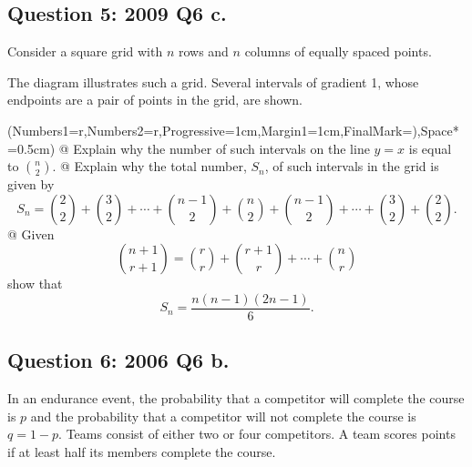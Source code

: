 \documentclass[a4paper,11pt]{article}
\begin{document}

\subsection*{Question 5: 2009 Q6 c.}
Consider a square grid with $n$ rows and $n$ columns of equally spaced points.

\begin{center}
\end{center}
The diagram illustrates such a grid. Several intervals of gradient 1, whose endpoints are a pair of points in the grid, are shown. 
\pagebreak
\vspace{0.15cm}
	\begin{easylist}[enumerate]
		\ListProperties(Numbers1=r,Numbers2=r,Progressive=1cm,Margin1=1cm,FinalMark={)},Space*=0.5cm)
		@ Explain why the number of such intervals on the line $y=x$ is equal to $\binom{n}{2}$.
        @ Explain why the total number, $S_n$, of such intervals in the grid is given by 
        $$
        S_n = \binom{2}{2} + \binom{3}{2} + \cdots + \binom{n-1}{2} + \binom{n}{2} + \binom{n-1}{2} + \cdots + \binom{3}{2} + \binom{2}{2}.
        $$
        @ Given 
        $$
        \binom{n+1}{r+1} = \binom{r}{r} + \binom{r+1}{r} + \cdots + \binom{n}{r}
        $$
        show that 
        $$
        S_n = \frac{n(n-1)(2n-1)}{6}.
        $$
    \end{easylist}
    
    \subsection*{Question 6: 2006 Q6 b.}
    In an endurance event, the probability that a competitor will complete the course is $p$ and the probability that a competitor will not complete the course is $q=1-p$. Teams consist of either two or four competitors. A team scores points if at least half its members complete the course.\\
    
\end{document}
